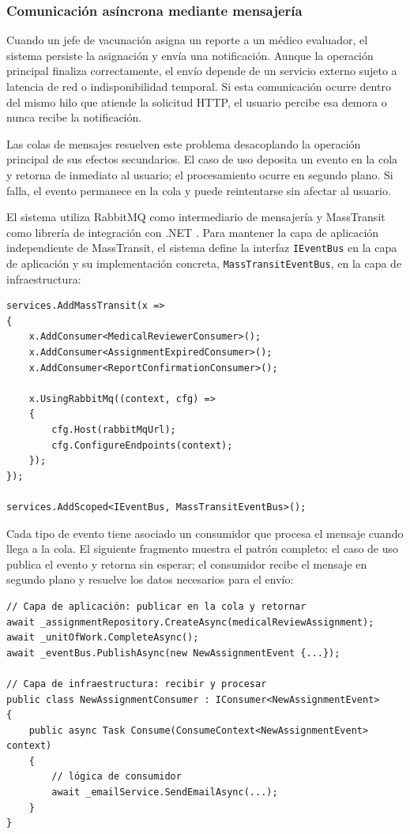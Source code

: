 \subsubsection{Comunicación asíncrona mediante mensajería}

Cuando un jefe de vacunación asigna un reporte a un médico evaluador, el sistema persiste la asignación y envía una notificación. 
Aunque la operación principal finaliza correctamente, el envío depende de un servicio externo sujeto a latencia de red o indisponibilidad temporal. 
Si esta comunicación ocurre dentro del mismo hilo que atiende la solicitud HTTP, el usuario percibe esa demora o nunca recibe la notificación.

Las colas de mensajes resuelven este problema desacoplando la operación principal de sus efectos secundarios. El caso de uso deposita un evento en la cola y retorna de inmediato al usuario; el procesamiento ocurre en segundo plano. Si falla, el evento permanece en la cola y puede reintentarse sin afectar al usuario.

El sistema utiliza RabbitMQ como intermediario de mensajería y MassTransit como librería de integración con .NET \cite{masstransit}. Para mantener la capa de aplicación independiente de MassTransit, el sistema define la interfaz \texttt{IEventBus} en la capa de aplicación y su implementación concreta, \texttt{MassTransitEventBus}, en la capa de infraestructura:

\begin{lstlisting}[language={[Sharp]C}, caption={Configuración de MassTransit con RabbitMQ}, label={lst:masstransit}]
services.AddMassTransit(x =>
{
    x.AddConsumer<MedicalReviewerConsumer>();
    x.AddConsumer<AssignmentExpiredConsumer>();
    x.AddConsumer<ReportConfirmationConsumer>();

    x.UsingRabbitMq((context, cfg) =>
    {
        cfg.Host(rabbitMqUrl);
        cfg.ConfigureEndpoints(context);
    });
});

services.AddScoped<IEventBus, MassTransitEventBus>();
\end{lstlisting}

Cada tipo de evento tiene asociado un consumidor que procesa el mensaje cuando llega a la cola. El siguiente fragmento muestra el patrón completo: el caso de uso publica el evento y retorna sin esperar; el consumidor recibe el mensaje en segundo plano y resuelve los datos necesarios para el envío:

\begin{lstlisting}[language={[Sharp]C}, caption={Publicación y consumo de un evento}, label={lst:publish_consume}]
// Capa de aplicación: publicar en la cola y retornar
await _assignmentRepository.CreateAsync(medicalReviewAssignment);
await _unitOfWork.CompleteAsync();
await _eventBus.PublishAsync(new NewAssignmentEvent {...});

// Capa de infraestructura: recibir y procesar
public class NewAssignmentConsumer : IConsumer<NewAssignmentEvent>
{
    public async Task Consume(ConsumeContext<NewAssignmentEvent> context)
    {
        // lógica de consumidor
        await _emailService.SendEmailAsync(...);
    }
}
\end{lstlisting}

